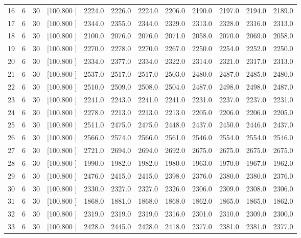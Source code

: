 \documentclass[12pt,a4paper]{article}
\begin{document}
\begin{center}
{\begin{tabular}{r r r r r r r r r r r r}
  16&  6& 30&[100.800   ]&  2224.0&  2226.0&  2224.0&  2206.0&  2190.0&  2197.0&  2194.0&  2189.0\\[-0.02in]
  17&  6& 30&[100.800   ]&  2344.0&  2355.0&  2344.0&  2329.0&  2313.0&  2328.0&  2316.0&  2313.0\\[-0.02in]
  18&  6& 30&[100.800   ]&  2100.0&  2076.0&  2076.0&  2071.0&  2058.0&  2070.0&  2069.0&  2058.0\\[-0.02in]
  19&  6& 30&[100.800   ]&  2270.0&  2278.0&  2270.0&  2267.0&  2250.0&  2254.0&  2252.0&  2250.0\\[-0.02in]
  20&  6& 30&[100.800   ]&  2334.0&  2377.0&  2334.0&  2322.0&  2314.0&  2321.0&  2317.0&  2313.0\\[-0.02in]
  21&  6& 30&[100.800   ]&  2537.0&  2517.0&  2517.0&  2503.0&  2480.0&  2487.0&  2485.0&  2480.0\\[-0.02in]
  22&  6& 30&[100.800   ]&  2510.0&  2509.0&  2508.0&  2504.0&  2487.0&  2498.0&  2498.0&  2487.0\\[-0.02in]
  23&  6& 30&[100.800   ]&  2241.0&  2243.0&  2241.0&  2241.0&  2231.0&  2237.0&  2237.0&  2231.0\\[-0.02in]
  24&  6& 30&[100.800   ]&  2278.0&  2213.0&  2213.0&  2213.0&  2205.0&  2206.0&  2206.0&  2205.0\\[-0.02in]
  25&  6& 30&[100.800   ]&  2511.0&  2475.0&  2475.0&  2448.0&  2437.0&  2450.0&  2446.0&  2437.0\\[-0.02in]
  26&  6& 30&[100.800   ]&  2566.0&  2574.0&  2566.0&  2561.0&  2546.0&  2554.0&  2554.0&  2546.0\\[-0.02in]
  27&  6& 30&[100.800   ]&  2721.0&  2694.0&  2694.0&  2692.0&  2675.0&  2675.0&  2675.0&  2675.0\\[-0.02in]
  28&  6& 30&[100.800   ]&  1990.0&  1982.0&  1982.0&  1980.0&  1963.0&  1970.0&  1967.0&  1962.0\\[-0.02in]
  29&  6& 30&[100.800   ]&  2476.0&  2415.0&  2415.0&  2398.0&  2376.0&  2380.0&  2380.0&  2376.0\\[-0.02in]
  30&  6& 30&[100.800   ]&  2330.0&  2327.0&  2327.0&  2326.0&  2306.0&  2309.0&  2308.0&  2306.0\\[-0.02in]
  31&  6& 30&[100.800   ]&  1868.0&  1881.0&  1868.0&  1868.0&  1862.0&  1865.0&  1865.0&  1862.0\\[-0.02in]
  32&  6& 30&[100.800   ]&  2319.0&  2319.0&  2319.0&  2316.0&  2301.0&  2310.0&  2309.0&  2300.0\\[-0.02in]
  33&  6& 30&[100.800   ]&  2428.0&  2445.0&  2428.0&  2418.0&  2377.0&  2381.0&  2381.0&  2377.0\\[-0.02in]

\end{tabular}}
\end{center}
\end{document}
